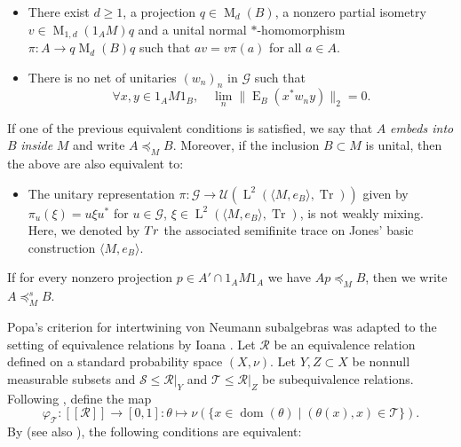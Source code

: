 \documentclass[11pt]{amsart}
\numberwithin{equation}{section}
\theoremstyle{plain}
\theoremstyle{definition}
\newcommand{\Tr}{\operatorname{Tr}}
\newcommand{\rM}{\operatorname{M}}
\newcommand{\rE}{\operatorname{ E}}
\newcommand{\rL}{\operatorname{L}}
\newcommand{\dom}{\operatorname{dom}}
\begin{document}
\begin{itemize}
\item [$(\rm i)$] There exist $d \geq 1$, a projection $q \in \rM_d(B)$, a nonzero partial isometry $v \in \rM_{1, d}(1_A M)q$ and a unital normal $\ast$-homomorphism $\pi : A \to q\rM_d(B)q$  such that $a v = v \pi(a)$ for all $a \in A$.

\item [$(\rm ii)$] There is no net of unitaries $(w_n)_n$ in $\mathscr G$ such that
$$\forall x, y \in 1_A M 1_B, \quad \lim_n \|\rE_B(x^* w_n y)\|_2 = 0.$$

\end{itemize}
If one of the previous equivalent conditions is satisfied, we say that $A$ {\it embeds into} $B$ {\it inside} $M$ and write $A \preceq_M B$.
Moreover, if  the inclusion $B\subset M$ is unital, then the above are also equivalent to:
\begin{itemize}
    \item [$(\rm iii)$]  The unitary representation $\pi: \mathscr G\to \mathscr U(\rL^2(\langle M, e_B\rangle, \Tr))$ given by $\pi_u (\xi)= u \xi u^*$ for $u \in \mathscr G$, $\xi \in \rL^2(\langle M, e_B\rangle, \Tr)$, is not weakly mixing. Here, we denoted by ${\rm Tr}$ the associated semifinite trace on Jones'\! basic construction $\langle M, e_B\rangle$.
\end{itemize}

If for every nonzero projection $p \in A' \cap 1_A M 1_A$ we have $Ap \preceq_M B$, then we write $A \preceq^s_M B$.

Popa's criterion for intertwining von Neumann subalgebras was adapted to the setting of equivalence relations by Ioana \cite{Io11}. Let $\mathscr R$ be an equivalence relation defined on a standard probability space $(X, \nu)$. Let $Y, Z \subset X$ be nonnull measurable subsets and $\mathscr S \leq \mathscr R|_Y$ and $\mathscr T \leq \mathscr R|_Z$ be subequivalence relations. Following \cite{IKT08}, define the map 
$$\varphi_{\mathscr T} : [[\mathscr R]] \to [0, 1] : \theta \mapsto \nu(\{x \in \dom(\theta) \mid (\theta(x), x) \in \mathscr T \}).$$
By \cite[Lemma 1.7]{Io11} (see also \cite[Lemma 3.1]{Sp21}), the following conditions are equivalent:
\end{document}
